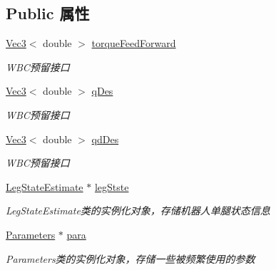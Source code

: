 \subsection*{Public 属性}
\begin{DoxyCompactItemize}
\item 
\mbox{\label{classquadruped_1_1SingleLeg_aaf4f8f8686ef952a15236892e7eacfd2}} 
\hyperlink{cppTypes_8h_a65c27bf97693676535dd0b30ea0ad399}{Vec3}$<$ double $>$ \hyperlink{classquadruped_1_1SingleLeg_aaf4f8f8686ef952a15236892e7eacfd2}{torque\+Feed\+Forward}
\begin{DoxyCompactList}\small\item\em W\+B\+C预留接口 \end{DoxyCompactList}\item 
\mbox{\label{classquadruped_1_1SingleLeg_a7463a742fbf6923728c4761393aa68e0}} 
\hyperlink{cppTypes_8h_a65c27bf97693676535dd0b30ea0ad399}{Vec3}$<$ double $>$ \hyperlink{classquadruped_1_1SingleLeg_a7463a742fbf6923728c4761393aa68e0}{q\+Des}
\begin{DoxyCompactList}\small\item\em W\+B\+C预留接口 \end{DoxyCompactList}\item 
\mbox{\label{classquadruped_1_1SingleLeg_a086eb6cdde5bf9583a244d1fd2f7d803}} 
\hyperlink{cppTypes_8h_a65c27bf97693676535dd0b30ea0ad399}{Vec3}$<$ double $>$ \hyperlink{classquadruped_1_1SingleLeg_a086eb6cdde5bf9583a244d1fd2f7d803}{qd\+Des}
\begin{DoxyCompactList}\small\item\em W\+B\+C预留接口 \end{DoxyCompactList}\item 
\mbox{\label{classquadruped_1_1SingleLeg_a2166770aa38c23e6ae2d07e1b8fc5aca}} 
\hyperlink{classquadruped_1_1LegStateEstimate}{Leg\+State\+Estimate} $\ast$ \hyperlink{classquadruped_1_1SingleLeg_a2166770aa38c23e6ae2d07e1b8fc5aca}{leg\+Stste}
\begin{DoxyCompactList}\small\item\em Leg\+State\+Estimate类的实例化对象，存储机器人单腿状态信息 \end{DoxyCompactList}\item 
\mbox{\label{classquadruped_1_1SingleLeg_ab3d1405314c2206d8b76413e7dd9268a}} 
\hyperlink{classquadruped_1_1Parameters}{Parameters} $\ast$ \hyperlink{classquadruped_1_1SingleLeg_ab3d1405314c2206d8b76413e7dd9268a}{para}
\begin{DoxyCompactList}\small\item\em Parameters类的实例化对象，存储一些被频繁使用的参数 \end{DoxyCompactList}\end{DoxyCompactItemize}



